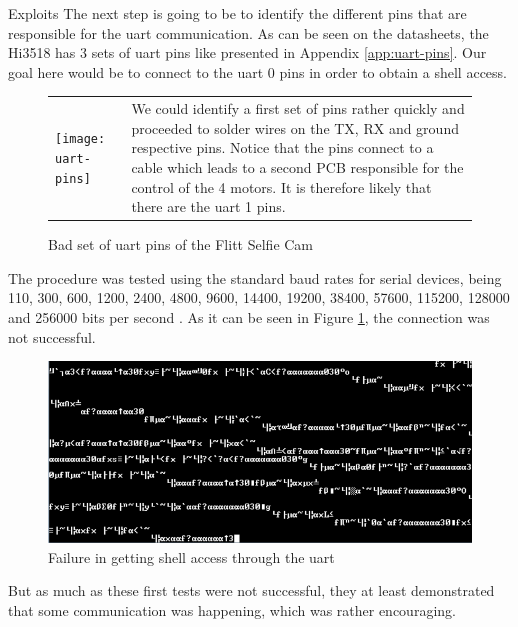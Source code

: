 \begin{chaptercover}{Exploits}
The next step is going to be to identify the different pins that are responsible for the \acrshort{uart} communication. As can be seen on the datasheets, the Hi3518 has 3 sets of \acrshort{uart} pins like presented in Appendix \ref{app:uart-pins}. Our goal here would be to connect to the \acrshort{uart} 0 pins in order to obtain a shell access.

\begin{figure}[H]
\begin{center}
\begin{tabular}{m{9.5cm}m{7.8cm}}
  \texttt{[image: uart-pins]}
  \caption{Bad set of \acrshort{uart} pins of the Flitt Selfie Cam}
  & We could identify a first set of pins rather quickly and proceeded to solder wires on the TX, RX and ground respective pins. Notice that the pins connect to a cable which leads to a second PCB responsible for the control of the 4 motors. It is therefore likely that there are the \acrshort{uart} 1 pins. \\
\end{tabular}
\end{center}
\end{figure}

The procedure was tested using the standard baud rates for serial devices, being 110, 300, 600, 1200, 2400, 4800, 9600, 14400, 19200, 38400, 57600, 115200, 128000 and 256000 bits per second \cite{baudrate}. As it can be seen in Figure \ref{fig:uart-shell-access-failure}, the connection was not successful. 

\begin{figure}[H]
  \centering
  \includegraphics[width=.8\linewidth]{figures/uart-shell-access-failure}
  \caption{Failure in getting shell access through the \acrshort{uart}}
  \label{fig:uart-shell-access-failure}
\end{figure}

But as much as these first tests were not successful, they at least demonstrated that some communication was happening, which was rather encouraging.


\end{chaptercover}
